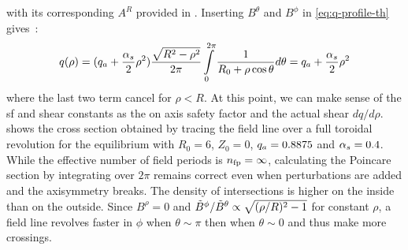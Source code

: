 with its corresponding $A^R$ provided in . Inserting $B^\theta$ and $B^\phi$ in \eqref{eq:q-profile-th} gives~:
\begin{align*}
     q(\rho) = (q_a+\frac{\alpha_s}{2}\rho^2)\frac{\sqrt{R^2-\rho^2}}{2\pi}\int\limits_{0}^{2\pi}\frac{1}{R_0 + \rho\cos{\theta}}d\theta = q_a+\frac{\alpha_s}{2}\rho^2
\end{align*}
where the last two term cancel for $\rho < R$. At this point, we can make sense of the sf and shear constants as the on axis safety factor and the actual shear $dq/d\rho$.  shows the cross section obtained by tracing the field line over a full toroidal revolution for the equilibrium with $R_0 = 6$, $Z_0 = 0$, $q_a = 0.8875$ and $\alpha_s = 0.4$. While the effective number of field periods is $n_\text{fp} = \infty$, calculating the Poincare section by integrating over $2\pi$ remains correct even when perturbations are added and the axisymmetry breaks. The density of intersections is higher on the inside than on the outside. Since $B^\rho = 0$ and $\Tilde{B}^\phi/\tilde{B}^\theta \propto \sqrt{(\rho/R)^2-1}$ for constant $\rho$, a field line revolves faster in $\phi$ when $\theta \sim \pi$ then when $\theta \sim 0$ and thus make more crossings.

